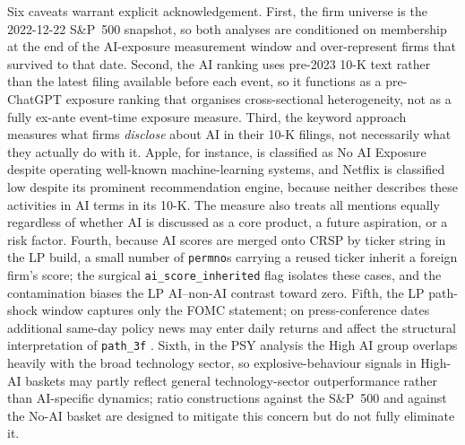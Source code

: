 Six caveats warrant explicit acknowledgement. First, the firm universe is the 2022-12-22 S\&P~500 snapshot, so both analyses are conditioned on membership at the end of the AI-exposure measurement window and over-represent firms that survived to that date. Second, the AI ranking uses pre-2023 10-K text rather than the latest filing available before each event, so it functions as a pre-ChatGPT exposure ranking that organises cross-sectional heterogeneity, not as a fully ex-ante event-time exposure measure. Third, the keyword approach measures what firms \emph{disclose} about AI in their 10-K filings, not necessarily what they actually do with it. Apple, for instance, is classified as No AI Exposure despite operating well-known machine-learning systems, and Netflix is classified low despite its prominent recommendation engine, because neither describes these activities in AI terms in its 10-K. The measure also treats all mentions equally regardless of whether AI is discussed as a core product, a future aspiration, or a risk factor. Fourth, because AI scores are merged onto CRSP by ticker string in the LP build, a small number of \texttt{permno}s carrying a reused ticker inherit a foreign firm's score; the surgical \texttt{ai\_score\_inherited} flag isolates these cases, and the contamination biases the LP AI--non-AI contrast toward zero. Fifth, the LP path-shock window captures only the FOMC statement; on press-conference dates additional same-day policy news may enter daily returns and affect the structural interpretation of \texttt{path\_3f} \citep{jarocinskiKaradi2020, mirandaAgrippinoRicco2021, gurkaynakKarasoyCanLee2022, durante2022}. Sixth, in the PSY analysis the High AI group overlaps heavily with the broad technology sector, so explosive-behaviour signals in High-AI baskets may partly reflect general technology-sector outperformance rather than AI-specific dynamics; ratio constructions against the S\&P~500 and against the No-AI basket are designed to mitigate this concern but do not fully eliminate it.

